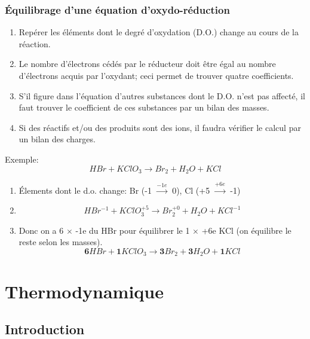 \documentclass[10pt,a4paper]{book}
\newcommand{\x}{$\times$ }
\begin{document}
\subsection{Équilibrage d'une équation d'oxydo-réduction}

\begin{enumerate}
\item Repérer les éléments dont le degré d'oxydation (D.O.) change au cours de la réaction.
\item Le nombre d'électrons cédés par le réducteur doit être égal au nombre d'électrons acquis par l'oxydant; ceci permet de trouver quatre coefficients.
\item S'il figure dans l'équation d'autres substances dont le D.O. n'est pas affecté, il faut
trouver le coefficient de ces substances par un bilan des masses.
\item Si des réactifs et/ou des produits sont des ions, il faudra vérifier le calcul par un
bilan des charges.
\end{enumerate}
Exemple: 
\begin{displaymath}
HBr + KClO_3 \longrightarrow Br_2 + H_2O + KCl
\end{displaymath}
\begin{enumerate}
\item Élements dont le d.o. change: Br (-1 $\xrightarrow{-1e}$ 0), Cl (+5 $\xrightarrow{+6e}$ -1) 
\item
\begin{displaymath}
HBr^{-1} + KClO_3^{+5} \longrightarrow Br_2^{+0} + H_2O + KCl^{-1} 
\end{displaymath}
\item Donc on a 6 \x -1e du HBr pour équilibrer le 1 \x +6e KCl (on équilibre le reste selon les masses).
\begin{displaymath}
\textbf{6}HBr + \textbf{1}KClO_3 \longrightarrow \textbf{3}Br_2 + \textbf{3}H_2O + \textbf{1}KCl
\end{displaymath}
\end{enumerate}

\chapter{Thermodynamique}

\section{Introduction}
\end{document}
